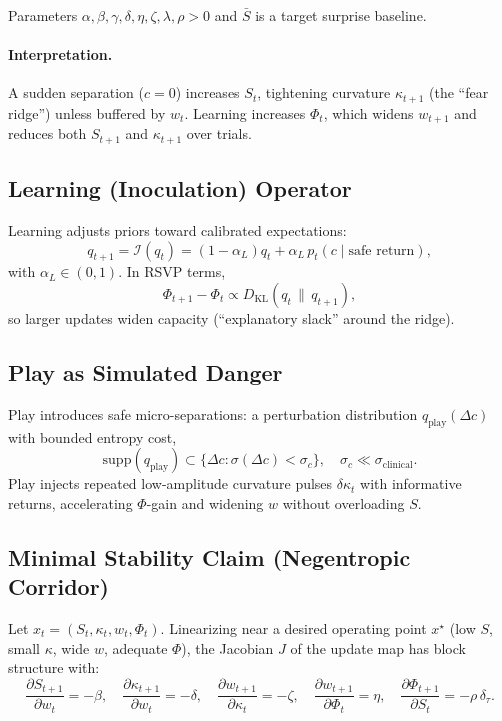 \documentclass{article}
\theoremstyle{definition}
\begin{document}
Parameters $\alpha,\beta,\gamma,\delta,\eta,\zeta,\lambda,\rho > 0$ and $\bar S$ is a target surprise baseline.

\paragraph{Interpretation.} A sudden separation ($c=0$) increases $S_t$, tightening curvature $\kappa_{t+1}$ (the ``fear ridge'') unless buffered by $w_t$. Learning increases $\Phi_t$, which widens $w_{t+1}$ and reduces both $S_{t+1}$ and $\kappa_{t+1}$ over trials.

\subsection{Learning (Inoculation) Operator}

Learning adjusts priors toward calibrated expectations:
\[
q_{t+1} = \mathcal{I}(q_t) = (1-\alpha_L) q_t + \alpha_L \, p_t(c \mid \text{safe return}),
\]
with $\alpha_L \in (0,1)$. In RSVP terms,
\[
\Phi_{t+1} - \Phi_t \propto D_{\mathrm{KL}}(q_t \,\|\, q_{t+1}),
\]
so larger updates widen capacity (``explanatory slack'' around the ridge).

\subsection{Play as Simulated Danger}

Play introduces safe micro-separations: a perturbation distribution $q_{\mathrm{play}}(\Delta c)$ with bounded entropy cost,
\[
\mathrm{supp}(q_{\mathrm{play}}) \subset \{\Delta c : \sigma(\Delta c) < \sigma_c\}, \quad \sigma_c \ll \sigma_{\mathrm{clinical}}.
\]
Play injects repeated low-amplitude curvature pulses $\delta \kappa_t$ with informative returns, accelerating $\Phi$-gain and widening $w$ without overloading $S$.

\subsection{Minimal Stability Claim (Negentropic Corridor)}

Let $x_t = (S_t, \kappa_t, w_t, \Phi_t)$. Linearizing near a desired operating point $x^\star$ (low $S$, small $\kappa$, wide $w$, adequate $\Phi$), the Jacobian $J$ of the update map has block structure with:
\[
\frac{\partial S_{t+1}}{\partial w_t} = -\beta, \quad
\frac{\partial \kappa_{t+1}}{\partial w_t} = -\delta, \quad
\frac{\partial w_{t+1}}{\partial \kappa_t} = -\zeta, \quad
\frac{\partial w_{t+1}}{\partial \Phi_t} = \eta, \quad
\frac{\partial \Phi_{t+1}}{\partial S_t} = -\rho \, \delta_\tau.
\]
\end{document}
